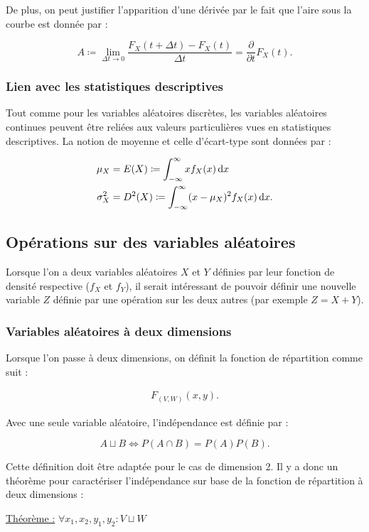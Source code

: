 \documentclass{article}
\renewcommand{\pd}[1]{\frac {\partial}{\partial #1}}
\begin{document}
			De plus, on peut justifier l'apparition d'une dérivée par le fait que l'aire sous la courbe est donnée par :

			\[A \coloneqq \lim_{\Delta t \to 0}\frac {F_X(t + \Delta t) - F_X(t)}{\Delta t} = \pd{t}F_X(t).\]

		\subsubsection{Lien avec les statistiques descriptives}
			Tout comme pour les variables aléatoires discrètes, les variables aléatoires continues peuvent être reliées aux valeurs particulières vues en statistiques
			descriptives. La notion de moyenne et celle d'écart-type sont données par :

			\begin{align}
				\mu_X &= E(X) \coloneqq \int_{-\infty}^\infty x f_X(x)\dif x \\
				\sigma_X^2 &= D^2(X) \coloneqq \int_{-\infty}^\infty(x-\mu_X)^2f_X(x)\dif x.
			\end{align}
	\subsection{Opérations sur des variables aléatoires}
		Lorsque l'on a deux variables aléatoires $X$ et $Y$ définies par leur fonction de densité respective ($f_X$ et $f_Y$), il serait intéressant de pouvoir définir une
		nouvelle variable $Z$ définie par une opération sur les deux autres (par exemple $Z = X+Y$).

		\subsubsection{Variables aléatoires à deux dimensions}
			Lorsque l'on passe à deux dimensions, on définit la fonction de répartition comme suit :

			\begin{align}
				F_{(V, W)}(x, y).
			\end{align}

			Avec une seule variable aléatoire, l'indépendance est définie par :

			\[A \sqcup B \iff P(A \cap B) = P(A)P(B).\]

			Cette définition doit être adaptée pour le cas de dimension 2. Il y a donc un théorème pour caractériser l'indépendance sur base de la fonction de répartition à deux
			dimensions :

			\underline{Théorème :} $\forall x_1, x_2, y_1, y_2 : V \sqcup W$
\end{document}
